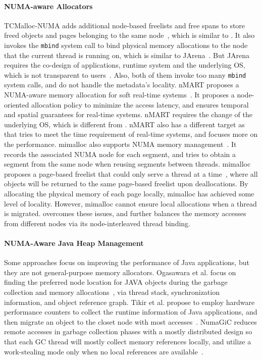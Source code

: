 \paragraph{NUMA-aware Allocators} TCMalloc-NUMA adds additional node-based freelists and free spans to store freed objects and pages belonging to the same node~\cite{tcmallocnuma}, which is similar to \NM{}. It also invokes the \texttt{mbind} system call to bind physical memory allocations to the node that the current thread is running on, which is similar to JArena~\cite{yang2019jarena}. But JArena requires the co-design of applications, runtime system and the underlying OS, which is not transparent to users~\cite{yang2019jarena}. Also, both of them invoke too many \texttt{mbind} system calls, and do not handle the metadata's locality. nMART proposes a NUMA-aware memory allocation for soft real-time systems~\cite{kim2013node}. It proposes a node-oriented allocation policy to minimize the access latency, and ensures temporal and spatial guarantees for real-time systems. nMART requires the change of the underlying OS, which is different from \NM{}. nMART also has a different target as 
\NM{} that tries to meet the time requirement of real-time systems, and \NM{} focuses more on the performance. 
mimalloc also supports NUMA memory management~\cite{mimalloc}. It records the associated NUMA node for each segment, and tries to obtain a segment from the same node when reusing segments between threads. mimalloc proposes a page-based freelist that could only serve a thread at a time~\cite{mimalloc}, where all objects will be returned to the same page-based freelist upon deallocations. By allocating the physical memory of each page locally, mimalloc has achieved some level of locality. However, mimalloc cannot ensure local allocations when a thread is migrated. \NM{} overcomes these issues, and further balances the memory accesses from different nodes via its node-interleaved thread binding. 


\paragraph{NUMA-Aware Java Heap Management} Some approaches focus on improving the performance of Java applications, but they are not general-purpose memory allocators. Ogasawara et al. focus on finding the preferred node location for JAVA objects during the garbage collection and memory allocations~\cite{Ogasawara}, via thread stack, synchronization information, and object reference graph. Tikir et al. propose to employ hardware performance counters to collect the runtime information of Java applications, and then migrate an object to the closet node with most accesses~\cite{1419934}. 
NumaGiC reduces remote accesses in garbage collection phases with a mostly distributed design so that each GC thread will mostly collect memory references locally, and utilize a work-stealing mode only when no local references are available~\cite{NumaGiC}.


